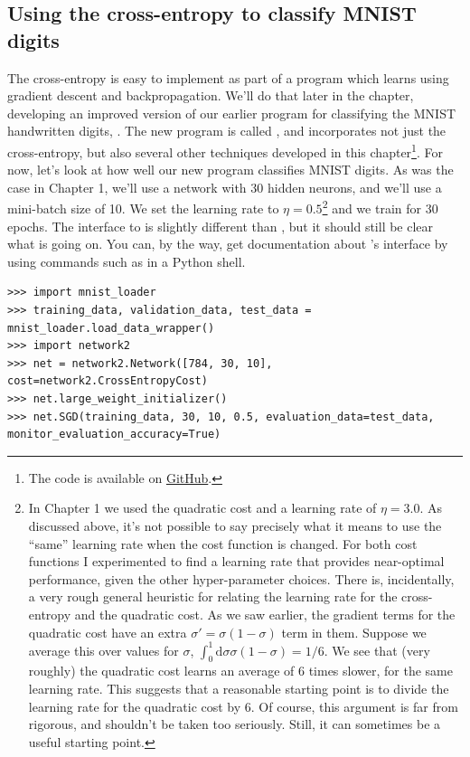 \documentclass[a4paper,twoside,10pt]{book}
\begin{document}
\subsection{Using the cross-entropy to classify MNIST digits}
The cross-entropy is easy to implement as part of a program which learns using gradient descent and backpropagation. We'll do that later in the chapter, developing an improved version of our earlier program for classifying the MNIST handwritten digits, . The new program is called , and incorporates not just the cross-entropy, but also several other techniques developed in this chapter\footnote{The code is available on \href{https://github.com/mnielsen/neural-networks-and-deep-learning/blob/master/src/network2.py}{GitHub}.}. For now, let's look at how well our new program classifies MNIST digits. As was the case in Chapter 1, we'll use a network with 30 hidden neurons, and we'll use a mini-batch size of 10. We set the learning rate to $\eta=0.5$\footnote{In Chapter 1 we used the quadratic cost and a learning rate of $\eta=3.0$. As discussed above, it's not possible to say precisely what it means to use the ``same'' learning rate when the cost function is changed. For both cost functions I experimented to find a learning rate that provides near-optimal performance, given the other hyper-parameter choices. \newline There is, incidentally, a very rough general heuristic for relating the learning rate for the cross-entropy and the quadratic cost. As we saw earlier, the gradient terms for the quadratic cost have an extra $\sigma' = \sigma(1-\sigma)$ term in them. Suppose we average this over values for $\sigma$, $\int_0^1\mathrm{d}\sigma \sigma(1-\sigma)=1/6$. We see that (very roughly) the quadratic cost learns an average of 6 times slower, for the same learning rate. This suggests that a reasonable starting point is to divide the learning rate for the quadratic cost by 6. Of course, this argument is far from rigorous, and shouldn't be taken too seriously. Still, it can sometimes be a useful starting point.} and we train for 30 epochs. The interface to  is slightly different than , but it should still be clear what is going on. You can, by the way, get documentation about 's interface by using commands such as  in a Python shell.
\begin{lstlisting}
>>> import mnist_loader
>>> training_data, validation_data, test_data = mnist_loader.load_data_wrapper()
>>> import network2
>>> net = network2.Network([784, 30, 10], cost=network2.CrossEntropyCost)
>>> net.large_weight_initializer()
>>> net.SGD(training_data, 30, 10, 0.5, evaluation_data=test_data, monitor_evaluation_accuracy=True)
\end{lstlisting}	
\end{document}
